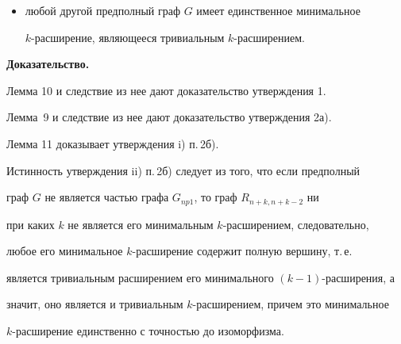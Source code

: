\begin{thm}
\begin{itemize}
\begin{itemize}
\begin{itemize}
$k$-расширением$;$ при $k = 2m - 1$ граф $G$ имеет два с точностью до


изоморфизма минимальных $k$-расширения${:}$ тривиальное $k$-расширение и


граф $R_{n+k,n+k-2};$


при $k > 2m - 1$ граф $G$ имеет единственное минимальное


$k$-расширение --- граф $R_{n+k,n+k-2};$


\item[ii)] любой другой предполный граф $G$ имеет единственное минимальное


$k$-рас\-ши\-ре\-ние, являющееся тривиальным $k$-рас\-ши\-ре\-нием.


\end{itemize}


\end{itemize}


\end{itemize}


\end{thm}





{\bf Доказательство.}


Лемма 10 и следствие из нее дают доказательство утверждения 1.


Лемма~9 и следствие из нее дают доказательство утверждения 2а).


Лемма 11 доказывает утверждения i) п.\,2б).


Истинность утверждения ii) п.\,2б) следует из того, что если предполный


граф $G$ не является частью графа $G_{np1}$, то граф $R_{n+k,n+k-2}$ ни


при каких $k$ не является его минимальным $k$-расширением, следовательно,


любое его минимальное $k$-расширение содержит полную вершину, т.\,е.


является тривиальным расширением его минимального $(k-1)$-расширения, а


значит, оно является и тривиальным $k$-расширением, причем это минимальное


$k$-расширение единственно с точностью до изоморфизма.





